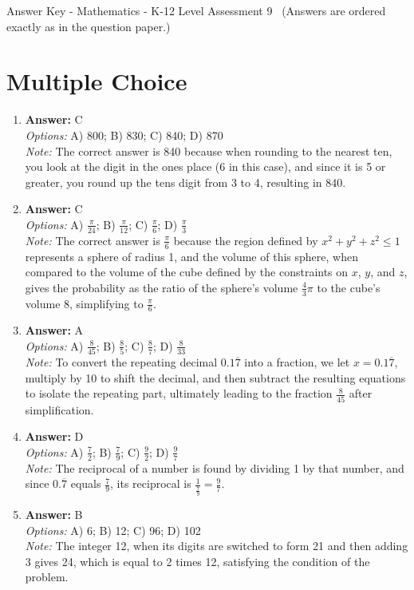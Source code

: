 \documentclass[12pt]{article}
\begin{document}
\begin{center}
Answer Key - Mathematics - K-12 Level Assessment 9 \
\small (Answers are ordered exactly as in the question paper.)
\end{center}

\section*{Multiple Choice}
\begin{enumerate}[label=\arabic*.]
\item \textbf{Answer:} C
\\ \textit{Options:} A) 800; B) 830; C) 840; D) 870
\\ \textit{Note:} The correct answer is 840 because when rounding to the nearest ten, you look at the digit in the ones place (6 in this case), and since it is 5 or greater, you round up the tens digit from 3 to 4, resulting in 840.
\item \textbf{Answer:} C
\\ \textit{Options:} A) \ensuremath{\frac{\pi}{24}}; B) \ensuremath{\frac{\pi}{12}}; C) \ensuremath{\frac{\pi}{6}}; D) \ensuremath{\frac{\pi}{3}}
\\ \textit{Note:} The correct answer is \(\frac{\pi}{6}\) because the region defined by \(x^2+y^2+z^2\le 1\) represents a sphere of radius 1, and the volume of this sphere, when compared to the volume of the cube defined by the constraints on \(x\), \(y\), and \(z\), gives the probability as the ratio of the sphere's volume \(\frac{4}{3}\pi\) to the cube's volume \(8\), simplifying to \(\frac{\pi}{6}\).
\item \textbf{Answer:} A
\\ \textit{Options:} A) \ensuremath{\frac{8}{45}}; B) \ensuremath{\frac{8}{5}}; C) \ensuremath{\frac{8}{7}}; D) \ensuremath{\frac{8}{33}}
\\ \textit{Note:} To convert the repeating decimal $0.1\overline{7}$ into a fraction, we let $x = 0.1\overline{7}$, multiply by 10 to shift the decimal, and then subtract the resulting equations to isolate the repeating part, ultimately leading to the fraction $\frac{8}{45}$ after simplification.
\item \textbf{Answer:} D
\\ \textit{Options:} A) \ensuremath{\frac{7}{2}}; B) \ensuremath{\frac{7}{9}}; C) \ensuremath{\frac{9}{2}}; D) \ensuremath{\frac{9}{7}}
\\ \textit{Note:} The reciprocal of a number is found by dividing 1 by that number, and since \( 0.\overline{7} \) equals \( \frac{7}{9} \), its reciprocal is \( \frac{1}{\frac{7}{9}} = \frac{9}{7} \).
\item \textbf{Answer:} B
\\ \textit{Options:} A) 6; B) 12; C) 96; D) 102
\\ \textit{Note:} The integer 12, when its digits are switched to form 21 and then adding 3 gives 24, which is equal to 2 times 12, satisfying the condition of the problem.
\end{enumerate}
\end{document}
